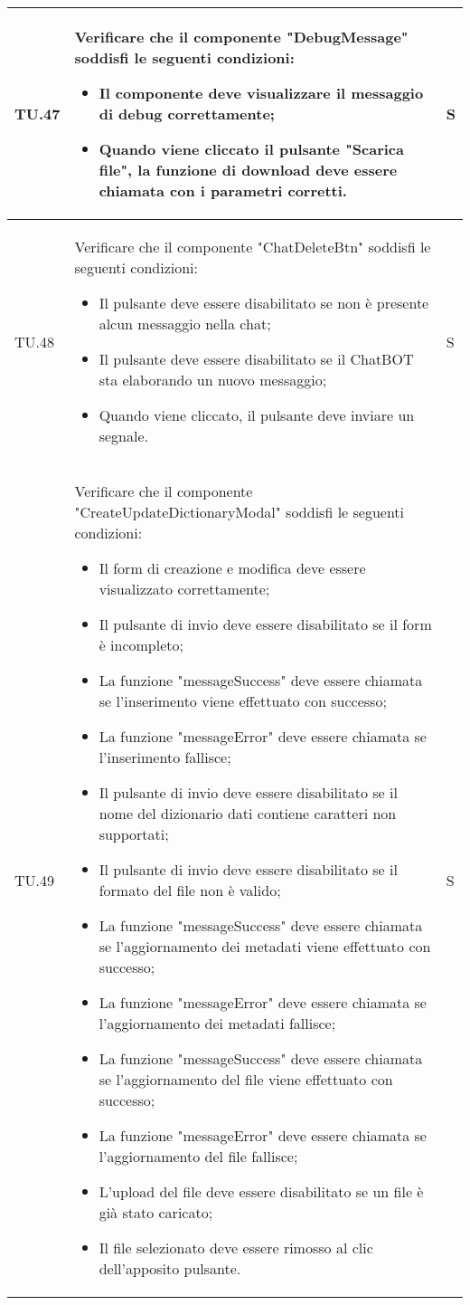 \begin{adjustwidth}{-0.5cm}{-0.5cm}
\begin{longtable}{|P{1.5cm}|>{\raggedright}P{9.5cm}|>{\arraybackslash}P{1.5cm}|}
		\hline TU.47 & Verificare che il componente "DebugMessage" soddisfi le seguenti condizioni:
    \begin{itemize}
      \item Il componente deve visualizzare il messaggio di debug correttamente;
			\item Quando viene cliccato il pulsante "Scarica file", la funzione di download deve essere chiamata con i parametri corretti.
    \end{itemize} & S \\

		\hline TU.48 & Verificare che il componente "ChatDeleteBtn" soddisfi le seguenti condizioni:
    \begin{itemize}
      \item Il pulsante deve essere disabilitato se non è presente alcun messaggio nella chat;
      \item Il pulsante deve essere disabilitato se il ChatBOT sta elaborando un nuovo messaggio;
      \item Quando viene cliccato, il pulsante deve inviare un segnale.
    \end{itemize} & S \\

		\hline TU.49 & Verificare che il componente "CreateUpdateDictionaryModal" soddisfi le seguenti condizioni:
    \begin{itemize}
      \item Il form di creazione e modifica deve essere visualizzato correttamente;
			\item Il pulsante di invio deve essere disabilitato se il form è incompleto;
			\item La funzione "messageSuccess" deve essere chiamata se l'inserimento viene effettuato con successo;
			\item La funzione "messageError" deve essere chiamata se l'inserimento fallisce;
			\item Il pulsante di invio deve essere disabilitato se il nome del dizionario dati contiene caratteri non supportati;
			\item Il pulsante di invio deve essere disabilitato se il formato del file non è valido;
			\item La funzione "messageSuccess" deve essere chiamata se l'aggiornamento dei metadati viene effettuato con successo;
			\item La funzione "messageError" deve essere chiamata se l'aggiornamento dei metadati fallisce;
			\item La funzione "messageSuccess" deve essere chiamata se l'aggiornamento del file viene effettuato con successo;
			\item La funzione "messageError" deve essere chiamata se l'aggiornamento del file fallisce;
			\item L'upload del file deve essere disabilitato se un file è già stato caricato;
			\item Il file selezionato deve essere rimosso al clic dell'apposito pulsante.
    \end{itemize} & S \\


\end{longtable}
\end{adjustwidth}
